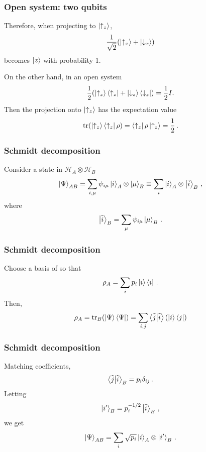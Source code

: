 \documentclass[12pt, aspectratio=169]{beamer}
\begin{document}
\begin{frame}
    \frametitle{Open system: two qubits}
    Therefore, when projecting to $\ket{\uparrow_z}$,
    \begin{equation*}
        \frac{1}{\sqrt{2}} (\ket{\uparrow_x} + \ket{\downarrow_x}) 
    \end{equation*}
    becomes $\ket{z}$ with probability 1.

    On the other hand, in an open system
    \begin{equation*}
        \frac{1}{2} (\ket{\uparrow_z}\bra{\uparrow_z} + \ket{\downarrow_z}\bra{\downarrow_z})
        = \frac{1}{2}I.
    \end{equation*}
    Then the projection onto $\ket{\uparrow_z}$ has the expectation value
    \begin{equation*}
        \tr( \ket{\uparrow_z}\bra{\uparrow_z}\rho) = \bra{\uparrow_z }\rho \ket{\uparrow_z} = \frac{1}{2} \,.
    \end{equation*}
\end{frame}


\begin{frame}
    \frametitle{Schmidt decomposition}
    Consider a state in $\mathcal{H}_A\otimes \mathcal{H}_B$
    \begin{equation*}
        \ket{\Psi}_{AB} 
        = \sum_{i,\mu} \psi_{i\mu} \ket{i}_A \otimes \ket{\mu}_B
        \equiv
        \sum_{i} \ket{i}_A \otimes \ket{\tilde i}_B \,,
    \end{equation*}
    where
    \begin{equation*}
        \ket{\tilde i}_B = \sum_\mu \psi_{i\mu} \ket{\mu}_B \,.
    \end{equation*}
\end{frame}


\begin{frame}
    \frametitle{Schmidt decomposition}
    Choose a basis of so that 
    \begin{equation*}
        \rho_A = \sum_i p_i \ket{i}\bra{i} \,.
    \end{equation*}
    Then,
    \begin{equation*}
        \rho_A = \tr_B (\ket{\Psi}\bra{\Psi})
        = \sum_{i,j} \braket{\tilde j}{\tilde i}(\ket{i}\bra{j})
    \end{equation*}
\end{frame}

\begin{frame}
    \frametitle{Schmidt decomposition}
Matching coefficients,
\begin{equation*}
    \braket{\tilde j}{\tilde i}_B = p_i \delta_{ij} \,.
\end{equation*}
Letting
\begin{equation*}
    \ket{i'}_B = p_i^{-1/2} \ket{\tilde i}_B \,,
\end{equation*}
we get
\begin{equation*}
    \ket{\Psi}_{AB} = \sum_i \sqrt{p_i} \ket{i}_A \otimes \ket{i'}_B \,.
\end{equation*}
\end{frame}



\printbibliography 
%
%
\end{document}
